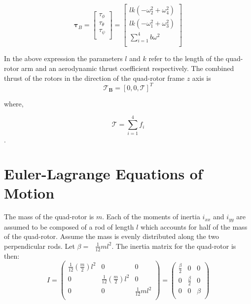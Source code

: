 \begin{equation}
    \label{taub}
    \boldsymbol \tau_B = \left[ \begin{array}{c} \tau_{\phi}\\\tau_{\theta}\\\tau_{\psi}\\ \end{array} \right] = \left[ \begin{array}{c} l k (-\omega_2^2 + \omega_4^2)\\l k (-\omega_1^2 + \omega_3^2)\\ \displaystyle \sum \limits_{i=1}^4 b \omega^2\\\end{array} \right]
\end{equation}

In the above expression the parameters $l$ and $k$ refer to the length of the quad-rotor arm and an aerodynamic thrust coefficient respectively. The combined thrust of the rotors in the direction of the quad-rotor frame $z$ axis is\\
\begin{equation}
\boldsymbol{\mathcal{T}_B} = [0, 0, \mathcal{T}]^T
\end{equation}

where,

\begin{equation}
    \label{totalThrust}
    \mathcal{T}=  \displaystyle \sum \limits_{i=1}^4 f_i
\end{equation}.



\section{Euler-Lagrange Equations of Motion}


\noindent
The mass of the quad-rotor is $m$. Each of the moments of inertia  $ i_{xx} $  and $ i_{yy} $
are assumed to be composed of a rod of length $ l $   which accounts for half of the mass of the quad-rotor. Assume the mass
is evenly distributed along the two perpendicular rods. Let  \(\beta  =\text{  }\frac{1}{12}m l^2 \). The inertia matrix for the quad-rotor is then: \\

\begin{equation}
I = \left(
\begin{array}{ccc}
 \frac{1}{12}\left(\frac{m}{2}\right)l^2 & 0 & 0 \\
 0 & \frac{1}{12}\left(\frac{m}{2}\right)l^2 & 0 \\
 0 & 0 & \frac{1}{12}m l^2 \\
\end{array}
\right) = \left(
\begin{array}{ccc}
 \frac{\beta }{2} & 0 & 0 \\
 0 & \frac{\beta }{2} & 0 \\
 0 & 0 & \beta  \\
\end{array}
\right)
\end{equation}

